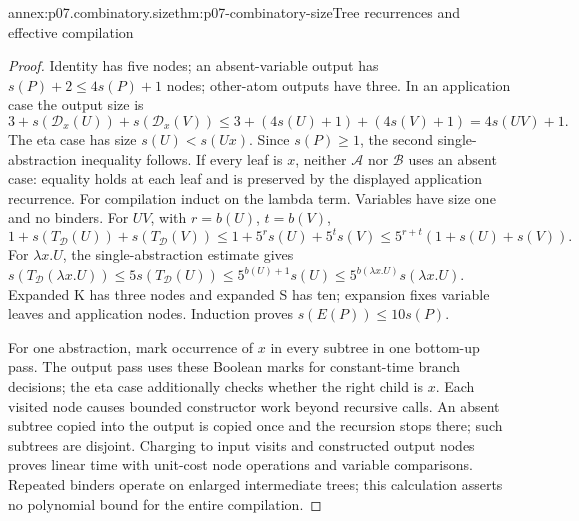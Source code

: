 \begin{annexitem}{annex:p07.combinatory.size}{thm:p07-combinatory-size}{Tree recurrences and effective compilation}
\begin{proof}
Identity has five nodes; an absent-variable output has \(s(P)+2\leq4s(P)+1\)
nodes; other-atom outputs have three.  In an application case the output size is
\[
 3+s(\mathcal D_x(U))+s(\mathcal D_x(V))
 \leq3+(4s(U)+1)+(4s(V)+1)=4s(UV)+1.
\]
The eta case has size \(s(U)<s(Ux)\).  Since \(s(P)\geq1\), the second
single-abstraction inequality follows.  If every leaf is \(x\), neither
\(\mathcal A\) nor \(\mathcal B\) uses an absent case: equality holds at
each leaf and is preserved by the displayed application recurrence.
For compilation induct on the lambda term.  Variables have size one and no
binders.  For \(UV\), with \(r=b(U)\), \(t=b(V)\),
\[
 1+s(T_{\mathcal D}(U))+s(T_{\mathcal D}(V))
 \leq1+5^r s(U)+5^t s(V)
 \leq5^{r+t}(1+s(U)+s(V)).
\]
For \(\lambda x.U\), the single-abstraction estimate gives
\(s(T_{\mathcal D}(\lambda x.U))\leq5s(T_{\mathcal D}(U))
\leq5^{b(U)+1}s(U)\leq5^{b(\lambda x.U)}s(\lambda x.U)\).
Expanded K has three nodes and expanded S has ten; expansion fixes variable
leaves and application nodes.  Induction proves \(s(E(P))\leq10s(P)\).

For one abstraction, mark occurrence of \(x\) in every subtree in one
bottom-up pass.  The output pass uses these Boolean marks for constant-time
branch decisions; the eta case additionally checks whether the right child is
\(x\).  Each visited node causes bounded constructor work beyond recursive
calls.  An absent subtree copied into the output is copied once and the
recursion stops there; such subtrees are disjoint.  Charging to input visits
and constructed output nodes proves linear time with unit-cost node operations
and variable comparisons.  Repeated binders operate on enlarged intermediate
trees; this calculation asserts no polynomial bound for the entire compilation.
\end{proof}
\end{annexitem}
